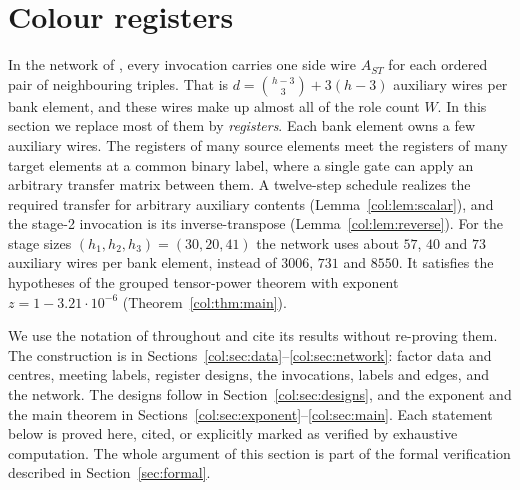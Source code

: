 \section{Colour registers}\label{sec:colour}

\newcommand{\colBot}{\mathrm{Bot}}
\newcommand{\colTop}{\mathrm{Top}}
\newcommand{\colXb}{\mathrm{Xb}}
\newcommand{\colYt}{\mathrm{Yt}}
\newcommand{\colDD}{\mathbb{D}}
\newcommand{\colK}{\widetilde K}

In the network of \cite[\S2]{oai}, every invocation carries one side wire $A_{ST}$ for each ordered pair
of neighbouring triples. That is $d=\binom{h-3}{3}+3(h-3)$ auxiliary wires per bank element, and these
wires make up almost all of the role count $W$. In this section we replace most of them by
\emph{registers}. Each bank element owns a few auxiliary wires. The registers of many source elements
meet the registers of many target elements at a common binary label, where a single gate can apply an
arbitrary transfer matrix between them. A twelve-step schedule realizes the required transfer for
arbitrary auxiliary contents (Lemma~\ref{col:lem:scalar}), and the stage-2 invocation is its
inverse-transpose (Lemma~\ref{col:lem:reverse}). For the stage sizes $(h_1,h_2,h_3)=(30,20,41)$ the
network uses about $57$, $40$ and $73$ auxiliary wires per bank element, instead of $3006$, $731$ and
$8550$. It satisfies the hypotheses of the grouped tensor-power theorem with exponent
$z=1-3.21\cdot10^{-6}$ (Theorem~\ref{col:thm:main}).

We use the notation of \cite[\S2]{oai} throughout and cite its results without re-proving them. The
construction is in Sections~\ref{col:sec:data}--\ref{col:sec:network}: factor data and centres, meeting
labels, register designs, the invocations, labels and edges, and the network. The designs follow in
Section~\ref{col:sec:designs}, and the exponent and the main theorem in
Sections~\ref{col:sec:exponent}--\ref{col:sec:main}. Each statement below is proved here, cited, or
explicitly marked as verified by exhaustive computation. The whole argument of this section is part of
the formal verification described in Section~\ref{sec:formal}.

